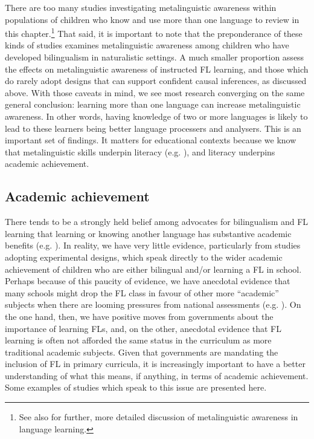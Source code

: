 \documentclass[output=paper]{langscibook}
\begin{document}
There are too many studies investigating metalinguistic awareness within populations of children who know and use more than one language to review in this chapter.\footnote{See also  for further, more detailed discussion of metalinguistic awareness in language learning.} That said, it is important to note that the preponderance of these kinds of studies examines metalinguistic awareness among children who have developed bilingualism in naturalistic settings. A much smaller proportion assess the effects on metalinguistic awareness of instructed FL learning, and those which do rarely adopt designs that can support confident causal inferences, as discussed above. With those caveats in mind, we see most research converging on the same general conclusion: learning more than one language can increase metalinguistic awareness. In other words, having knowledge of two or more languages is likely to lead to these learners being better language processers and analysers. This is an important set of findings. It matters for educational contexts because we know that metalinguistic skills underpin literacy (e.g. \citealt{Murphy2018}), and literacy underpins academic achievement. 

\subsection{Academic achievement}

There tends to be a strongly held belief among advocates for bilingualism and FL learning that learning or knowing another language has substantive academic benefits (e.g. \citealt{Holster2005}). In reality, we have very little evidence, particularly from studies adopting experimental designs, which speak directly to the wider academic achievement of children who are either bilingual and/or learning a FL in school. Perhaps because of this paucity of evidence, we have anecdotal evidence that many schools might drop the FL class in favour of other more ``academic'' subjects when there are looming pressures from national assessments (e.g. \citealt{ELLiE2011,Murphy2014}). On the one hand, then, we have positive moves from governments about the importance of learning FLs, and, on the other, anecdotal evidence that FL learning is often not afforded the same status in the curriculum as more traditional academic subjects. Given that governments are mandating the inclusion of FL in primary curricula, it is increasingly important to have a better understanding of what this means, if anything, in terms of academic achievement. Some examples of studies which speak to this issue are presented here.
\end{document}
